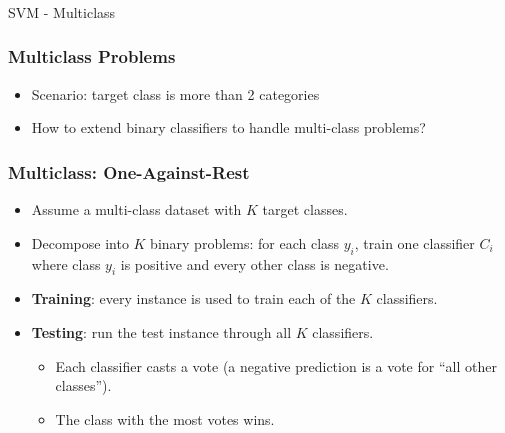 \begin{frame}[fragile]\frametitle{}
\begin{center}
{\Large SVM - Multiclass}
\end{center}
\end{frame}


\begin{frame}[fragile]\frametitle{Multiclass Problems}
\begin{itemize}
\item Scenario: target class is more than 2 categories
\item How to extend binary classifiers to handle multi-class problems?
\end{itemize}
\end{frame}

\begin{frame}[fragile]\frametitle{Multiclass: One-Against-Rest}
\begin{itemize}
\item Assume a multi-class dataset with $K$ target classes.
\item Decompose into $K$ binary problems: for each class $y_i$, train one classifier $C_i$ where class $y_i$ is positive and every other class is negative.
\item \textbf{Training}: every instance is used to train each of the $K$ classifiers.
\item \textbf{Testing}: run the test instance through all $K$ classifiers.
\begin{itemize}
\item Each classifier casts a vote (a negative prediction is a vote for ``all other classes'').
\item The class with the most votes wins.
\end{itemize}
\end{itemize}
\end{frame}

